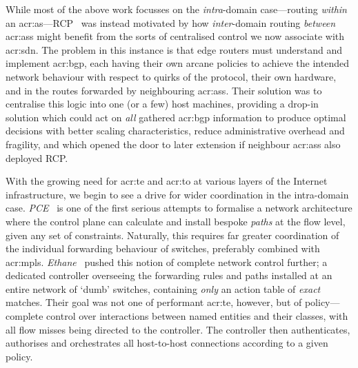 While most of the above work focusses on the \emph{intra}-domain case---routing \emph{within} an \gls{acr:as}---RCP~\parencite{DBLP:conf/nsdi/CaesarCFRSM05,10.1145/1016707.1016709} was instead motivated by how \emph{inter}-domain routing \emph{between} \glspl{acr:as} might benefit from the sorts of centralised control we now associate with \gls{acr:sdn}.
The problem in this instance is that edge routers must understand and implement \gls{acr:bgp}, each having their own arcane policies to achieve the intended network behaviour with respect to quirks of the protocol, their own hardware, and in the routes forwarded by neighbouring \glspl{acr:as}.
Their solution was to centralise this logic into one (or a few) host machines, providing a drop-in solution which could act on \emph{all} gathered \gls{acr:bgp} information to produce optimal decisions with better scaling characteristics, reduce administrative overhead and fragility, and which opened the door to later extension if neighbour \glspl{acr:as} also deployed RCP.

With the growing need for \gls{acr:te} and \gls{acr:to} at various layers of the Internet infrastructure, we begin to see a drive for wider coordination in the intra-domain case.
\emph{PCE}~\parencite{rfc4655} is one of the first serious attempts to formalise a network architecture where the control plane can calculate and install bespoke \emph{paths} at the flow level, given any set of constraints.
Naturally, this requires far greater coordination of the individual forwarding behaviour of switches, preferably combined with \gls{acr:mpls}.
\emph{Ethane}~\parencite{DBLP:conf/sigcomm/CasadoFPLMS07} pushed this notion of complete network control further; a dedicated controller overseeing the forwarding rules and paths installed at an entire network of `dumb' switches, containing \emph{only} an action table of \emph{exact} matches.
Their goal was not one of performant \gls{acr:te}, however, but of policy---complete control over interactions between named entities and their classes, with all flow misses being directed to the controller.
The controller then authenticates, authorises and orchestrates all host-to-host connections according to a given policy.

